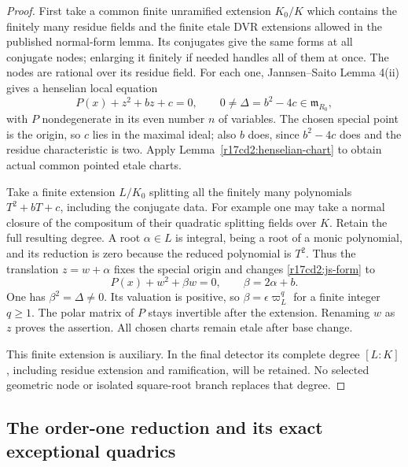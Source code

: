 \begin{proof}
First take a common finite unramified extension $K_0/K$
which contains the finitely many residue fields and the
finite etale DVR extensions allowed in the published
normal-form lemma. Its conjugates give the same forms
at all conjugate nodes; enlarging it finitely if needed
handles all of them at once. The nodes are rational over
its residue field. For each one, Jannsen--Saito Lemma 4(ii)
gives a henselian local equation
\[
                   P(x)+z^2+bz+c=0,
       \qquad 0\ne\Delta=b^2-4c\in\mathfrak m_{R_0},
 \tag{CD217.2}\label{r17cd2:js-form}
\]
with $P$ nondegenerate in its even number $n$ of variables.
The chosen special point is the origin, so $c$ lies in
the maximal ideal; also $b$ does, since $b^2-4c$ does
and the residue characteristic is two. Apply
Lemma~\ref{r17cd2:henselian-chart} to obtain actual common
pointed etale charts.

Take a finite extension $L/K_0$ splitting all the finitely
many polynomials $T^2+bT+c$, including the conjugate data.
For example one may take a normal closure of the compositum
of their quadratic splitting fields over $K$. Retain the
full resulting degree. A root $\alpha\in L$ is integral,
being a root of a monic polynomial, and its reduction is
zero because the reduced polynomial is $T^2$. Thus the
translation $z=w+\alpha$ fixes the special origin and
changes \eqref{r17cd2:js-form} to
\[
                    P(x)+w^2+\beta w=0,
                    \qquad \beta=2\alpha+b.
\]
One has $\beta^2=\Delta\ne0$. Its valuation is positive,
so $\beta=\epsilon\varpi_L^q$ for a finite integer
$q\ge1$. The polar matrix of $P$ stays invertible after
the extension. Renaming $w$ as $z$ proves the assertion.
All chosen charts remain etale after base change.

This finite extension is auxiliary. In the final detector
its complete degree $[L:K]$, including residue extension
and ramification, will be retained. No selected geometric
node or isolated square-root branch replaces that degree.
\end{proof}

\subsection{The order-one reduction and its exact exceptional quadrics}

